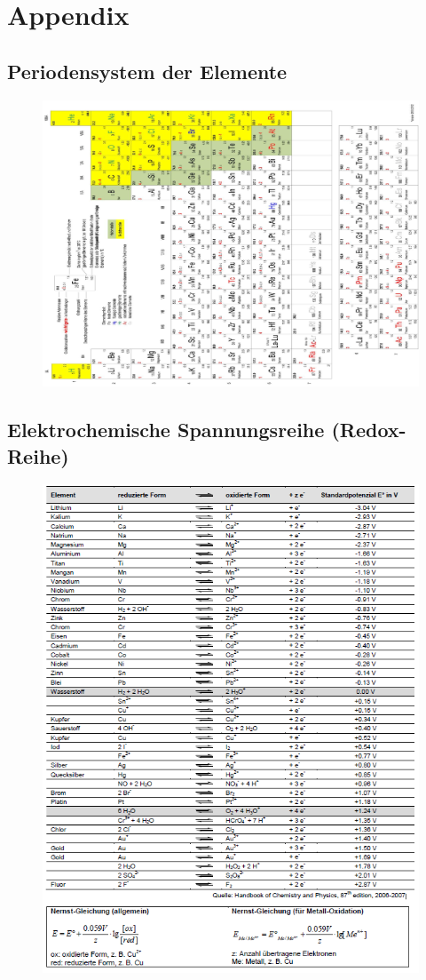 \appendix
\onecolumn
\section{Appendix}

\subsection{Periodensystem der Elemente}
\begin{figure}[htbp]
	\centering
	\includegraphics[width=\linewidth]{images/A_Periodensystem.png}
\end{figure}

\newpage

\subsection{Elektrochemische Spannungsreihe (Redox-Reihe)}
\begin{figure}[htbp!]
	\centering
	\includegraphics[width=0.85\linewidth]{images/A_Redox_Reihe.png}
\end{figure}
